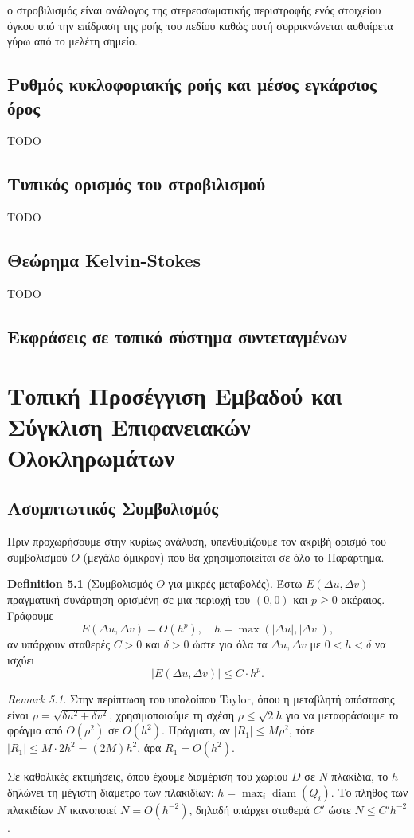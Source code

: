 \documentclass[10pt,a4paper,twoside,openany]{book}
\theoremstyle{plain}
\theoremstyle{definition}
\newtheorem{definition}[theorem]{Definition}
\theoremstyle{remark}
\newtheorem{remark}[theorem]{Remark}
\numberwithin{equation}{section}
\begin{document}
ο στροβιλισμός είναι ανάλογος της στερεοσωματικής περιστροφής
ενός στοιχείου όγκου υπό την επίδραση της ροής του πεδίου
καθώς αυτή συρρικνώνεται αυθαίρετα γύρω από το μελέτη σημείο.


\section{Ρυθμός κυκλοφοριακής ροής και μέσος εγκάρσιος όρος}
TODO

\section{Τυπικός ορισμός του στροβιλισμού}

TODO

\section{Θεώρημα Kelvin-Stokes}

TODO

\section{Εκφράσεις σε τοπικό σύστημα συντεταγμένων}

\chapter{Τοπική Προσέγγιση Εμβαδού και Σύγκλιση Επιφανειακών Ολοκληρωμάτων}

\section{Ασυμπτωτικός Συμβολισμός}

Πριν προχωρήσουμε στην κυρίως ανάλυση, υπενθυμίζουμε τον ακριβή ορισμό του συμβολισμού \(O\) (μεγάλο όμικρον) που θα χρησιμοποιείται σε όλο το Παράρτημα.

\begin{definition}[Συμβολισμός \(O\) για μικρές μεταβολές]
Έστω \(E(\Delta u, \Delta v)\) πραγματική συνάρτηση ορισμένη σε μια περιοχή του \((0,0)\) και \(p \ge 0\) ακέραιος. Γράφουμε
\[
E(\Delta u, \Delta v) = O(h^p), \quad h = \max(|\Delta u|, |\Delta v|),
\]
αν υπάρχουν σταθερές \(C > 0\) και \(\delta > 0\) ώστε για όλα τα \(\Delta u, \Delta v\) με \(0 < h < \delta\) να ισχύει
\[
|E(\Delta u, \Delta v)| \le C \cdot h^p.
\]
\end{definition}

\begin{remark}
Στην περίπτωση του υπολοίπου Taylor, όπου η μεταβλητή απόστασης είναι \(\rho = \sqrt{\delta u^2 + \delta v^2}\), χρησιμοποιούμε τη σχέση \(\rho \le \sqrt{2} h\) για να μεταφράσουμε το φράγμα από \(O(\rho^2)\) σε \(O(h^2)\). Πράγματι, αν \(|R_1| \le M \rho^2\), τότε \(|R_1| \le M \cdot 2h^2 = (2M) h^2\), άρα \(R_1 = O(h^2)\).

Σε καθολικές εκτιμήσεις, όπου έχουμε διαμέριση του χωρίου \(D\) σε \(N\) πλακίδια, το \(h\) δηλώνει τη μέγιστη διάμετρο των πλακιδίων: \(h = \max_i \operatorname{diam}(Q_i)\). Το πλήθος των πλακιδίων \(N\) ικανοποιεί \(N = O(h^{-2})\), δηλαδή υπάρχει σταθερά \(C'\) ώστε \(N \le C' h^{-2}\).
\end{remark}
\end{document}
